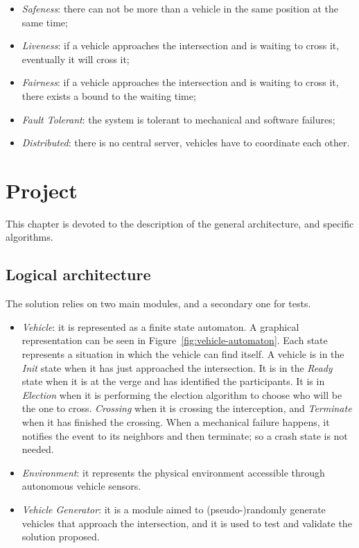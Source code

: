 \documentclass{memoir}
\begin{document}
\begin{itemize}
	\item \emph{Safeness}: there can not be more than a vehicle in the same position at the same time;
	\item \emph{Liveness}: if a vehicle approaches the intersection and is waiting to cross it, eventually it will cross it;
	\item \emph{Fairness}: if a vehicle approaches the intersection and is waiting to cross it, there exists a bound to the waiting time;
	\item \emph{Fault Tolerant}: the system is tolerant to mechanical and software failures;
	\item \emph{Distributed}: there is no central server, vehicles have to coordinate each other.
\end{itemize}



\chapter{Project}\label{ch:project}
This chapter is devoted to the description of the general architecture, and specific algorithms.

\section{Logical architecture}
The solution relies on two main modules, and a secondary one for tests.

\begin{itemize}
	\item \emph{Vehicle}: it is represented as a finite state automaton. A graphical representation can be seen in Figure~\ref{fig:vehicle-automaton}. Each state represents a situation in which the vehicle can find itself. A vehicle is in the \emph{Init} state when it has just approached the intersection. It is in the \emph{Ready} state when it is at the verge and has identified the participants. It is in \emph{Election} when it is performing the election algorithm to choose who will be the one to cross. \emph{Crossing} when it is crossing the interception, and \emph{Terminate} when it has finished the crossing. When a mechanical failure happens, it notifies the event to its neighbors and then terminate; so a crash state is not needed.
	\item \emph{Environment}: it represents the physical environment accessible through autonomous vehicle sensors.
	\item \emph{Vehicle Generator}: it is a module aimed to (pseudo-)randomly generate vehicles that approach the intersection, and it is used to test and validate the solution proposed.
\end{itemize}
\end{document}
